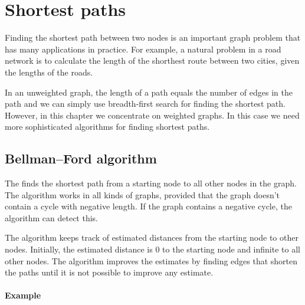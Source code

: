 \chapter{Shortest paths}


Finding the shortest path between two nodes
is an important graph problem that has many
applications in practice.
For example, a natural problem in a road network
is to calculate the length of the shorthest route
between two cities, given the lengths of the roads.

In an unweighted graph, the length of a path equals
the number of edges in the path and we can
simply use breadth-first search for finding
the shortest path.
However, in this chapter we concentrate on
weighted graphs.
In this case we need more sophisticated algorithms
for finding shortest paths.

\section{Bellman–Ford algorithm}


The  finds the
shortest path from a starting node to all
other nodes in the graph.
The algorithm works in all kinds of graphs,
provided that the graph doesn't contain a
cycle with negative length.
If the graph contains a negative cycle,
the algorithm can detect this.

The algorithm keeps track of estimated distances
from the starting node to other nodes.
Initially, the estimated distance is 0
to the starting node and infinite to all other nodes.
The algorithm improves the estimates by finding
edges that shorten the paths until it is not
possible to improve any estimate.

\subsubsection{Example}

